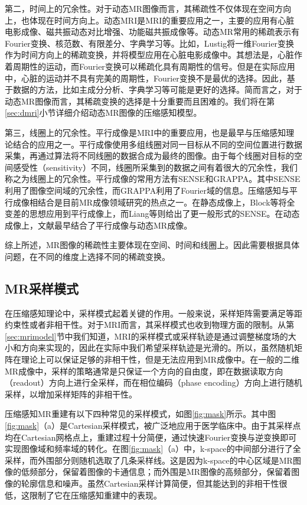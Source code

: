 第二，时间上的冗余性。对于动态MR图像而言，其稀疏性不仅体现在空间方向上，也体现在时间方向上。动态MRI是MRI的重要应用之一，主要的应用有心脏电影成像、磁共振动态对比增强、功能磁共振成像等。动态MR常用的稀疏表示有Fourier变换、核范数、有限差分、字典学习等。比如，Lustig\cite{lustig2006}将一维Fourier变换作为时间方向上的稀疏变换，并将模型应用在心脏电影成像中。其想法是，心脏作着周期性的运动，而Fourier变换可以稀疏化具有周期性的信号。但是在实际应用中，心脏的运动并不具有完美的周期性，Fourier变换不是最优的选择。因此，基于数据的方法，比如主成分分析、字典学习等可能是更好的选择。简而言之，对于动态MR图像而言，其稀疏变换的选择是十分重要而且困难的。我们将在第\ref{sec:dmri}小节详细介绍动态MR图像的压缩感知模型。

第三，线圈上的冗余性。平行成像是MRI中的重要应用，也是最早与压缩感知理论结合的应用之一。平行成像使用多组线圈对同一目标从不同的空间位置进行数据采集，再通过算法将不同线圈的数据合成为最终的图像。由于每个线圈对目标的空间感受性（sensitivity）不同，线圈所采集到的数据之间有着很大的冗余性，我们称之为线圈上的冗余性。平行成像的常用方法有SENSE\cite{sense}和GRAPPA\cite{grappa}。其中SENSE利用了图像空间域的冗余性，而GRAPPA利用了Fourier域的信息。压缩感知与平行成像相结合是目前MR成像领域研究的热点之一。在静态成像上，Block等\cite{block2007undersampled}将全变差的思想应用到平行成像上，而Liang\cite{liang2009accelerating}等则给出了更一般形式的SENSE。在动态成像上，文献\cite{igrasp,focuss}最早结合了平行成像与动态MR成像。

综上所述，MR图像的稀疏性主要体现在空间、时间和线圈上。因此需要根据具体问题，在不同的维度上选择不同的稀疏变换。

\subsection{MR采样模式}
在压缩感知理论中，采样模式起着关键的作用。一般来说，采样矩阵需要满足等距约束性或者非相干性。对于MRI而言，其采样模式也收到物理方面的限制。从第\ref{sec:mrimodel}节中我们知道，MRI的采样模式或采样轨迹是通过调整梯度场的大小和方向来实现的，因此在实际中我们希望采样轨迹是光滑的。所以，虽然随机矩阵在理论上可以保证足够的非相干性，但是无法应用到MR成像中。在一般的二维MR成像中，采样的策略通常是只保证一个方向的自由度，即在数据读取方向（readout）方向上进行全采样，而在相位编码（phase encoding）方向上进行随机采样，以增加采样矩阵的非相干性。

压缩感知MR重建有以下四种常见的采样模式，如图\ref{fig:mask}所示。其中图\ref{fig:mask}（a）是Cartesian采样模式，被广泛地应用于医学临床中。由于其采样点均在Cartesian网格点上，重建过程十分简便，通过快速Fourier变换与逆变换即可实现图像域和频率域的转化。在图\ref{fig:mask}（a）中，k-space的中间部分进行了全采样，而外围部分则随机选取了几条采样线。这是因为k-space的中心区域是MR图像的低频部分，保留着图像的卡通信息；而外围是MR图像的高频部分，保留着图像的轮廓信息和噪声。虽然Cartesian采样计算简便，但其能达到的非相干性很低，这限制了它在压缩感知重建中的表现。

